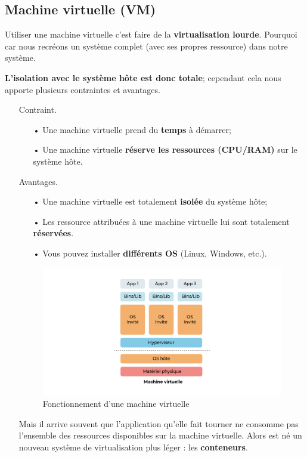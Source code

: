 \documentclass[12pt,a4paper]{article}
\begin{document}
\subsection{Machine virtuelle (VM)}
Utiliser une machine virtuelle c'est faire de la \textbf{virtualisation lourde}. Pourquoi car
nous recréons un système complet (avec ses propres ressource) dans notre système.

\textbf{L'isolation avec le système hôte est donc totale}; cependant cela nous apporte 
plusieurs contraintes et avantages.
\begin{itemize}
\item[] Contraint.
\begin{itemize}
\item[•] Une machine virtuelle prend du \textbf{temps} à démarrer;
\item[•] Une machine virtuelle \textbf{réserve les ressources (CPU/RAM)} sur le système 
hôte.
\end{itemize}
\item[] Avantages.
\begin{itemize}
\item[•] Une machine virtuelle est totalement \textbf{isolée} du système hôte;
\item[•] Les ressource attribuées à une machine virtuelle lui sont totalement \textbf{réservées}.
\item[•] Vous pouvez installer \textbf{différents OS} (Linux, Windows, etc.).
\end{itemize}

\begin{figure}[!t]
\centering
\includegraphics[scale=0.3]{img/vm.png}
\caption{Fonctionnement d'une machine virtuelle}
\label{Tux}
\end{figure}

Mais il arrive souvent que l'application qu'elle fait tourner ne consomme pas l'ensemble 
des ressources disponibles sur la machine virtuelle. Alors est né un nouveau système de 
virtualisation plus léger : les \textbf{conteneurs}.
\end{itemize}
\end{document}
